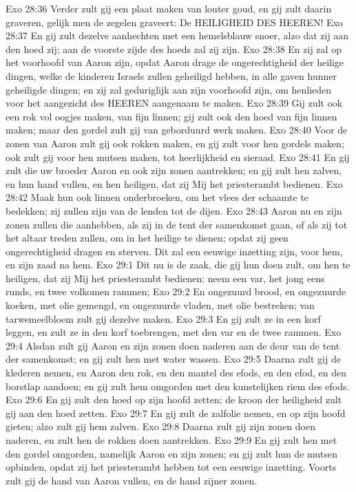 Exo 28:36  Verder zult gij een plaat maken van louter goud, en gij zult daarin graveren, gelijk men de zegelen graveert: De HEILIGHEID DES HEEREN!
Exo 28:37  En gij zult dezelve aanhechten met een hemelsblauw snoer, alzo dat zij aan den hoed zij; aan de voorste zijde des hoeds zal zij zijn.
Exo 28:38  En zij zal op het voorhoofd van Aaron zijn, opdat Aaron drage de ongerechtigheid der heilige dingen, welke de kinderen Israels zullen geheiligd hebben, in alle gaven hunner geheiligde dingen; en zij zal geduriglijk aan zijn voorhoofd zijn, om henlieden voor het aangezicht des HEEREN aangenaam te maken.
Exo 28:39  Gij zult ook een rok vol oogjes maken, van fijn linnen; gij zult ook den hoed van fijn linnen maken; maar den gordel zult gij van geborduurd werk maken.
Exo 28:40  Voor de zonen van Aaron zult gij ook rokken maken, en gij zult voor hen gordels maken; ook zult gij voor hen mutsen maken, tot heerlijkheid en sieraad.
Exo 28:41  En gij zult die uw broeder Aaron en ook zijn zonen aantrekken; en gij zult hen zalven, en hun hand vullen, en hen heiligen, dat zij Mij het priesterambt bedienen.
Exo 28:42  Maak hun ook linnen onderbroeken, om het vlees der schaamte te bedekken; zij zullen zijn van de lenden tot de dijen.
Exo 28:43  Aaron nu en zijn zonen zullen die aanhebben, als zij in de tent der samenkomst gaan, of als zij tot het altaar treden zullen, om in het heilige te dienen; opdat zij geen ongerechtigheid dragen en sterven. Dit zal een eeuwige inzetting zijn, voor hem, en zijn zaad na hem.
Exo 29:1  Dit nu is de zaak, die gij hun doen zult, om hen te heiligen, dat zij Mij het priesterambt bedienen: neem een var, het jong eens runds, en twee volkomen rammen;
Exo 29:2  En ongezuurd brood, en ongezuurde koeken, met olie gemengd, en ongezuurde vladen, met olie bestreken; van tarwemeelbloem zult gij dezelve maken.
Exo 29:3  En gij zult ze in een korf leggen, en zult ze in den korf toebrengen, met den var en de twee rammen.
Exo 29:4  Alsdan zult gij Aaron en zijn zonen doen naderen aan de deur van de tent der samenkomst; en gij zult hen met water wassen.
Exo 29:5  Daarna zult gij de klederen nemen, en Aaron den rok, en den mantel des efods, en den efod, en den borstlap aandoen; en gij zult hem omgorden met den kunstelijken riem des efods.
Exo 29:6  En gij zult den hoed op zijn hoofd zetten; de kroon der heiligheid zult gij aan den hoed zetten.
Exo 29:7  En gij zult de zalfolie nemen, en op zijn hoofd gieten; alzo zult gij hem zalven.
Exo 29:8  Daarna zult gij zijn zonen doen naderen, en zult hen de rokken doen aantrekken.
Exo 29:9  En gij zult hen met den gordel omgorden, namelijk Aaron en zijn zonen; en gij zult hun de mutsen opbinden, opdat zij het priesterambt hebben tot een eeuwige inzetting. Voorts zult gij de hand van Aaron vullen, en de hand zijner zonen.
